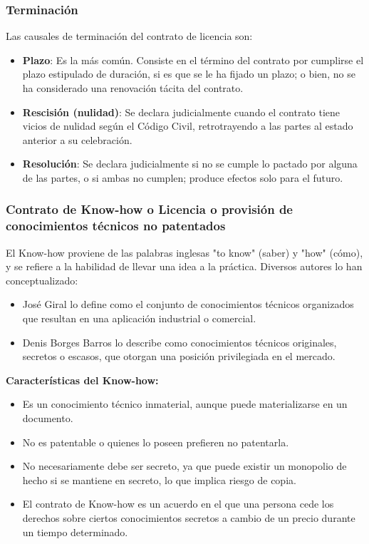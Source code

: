 \documentclass{templateNote}
\begin{document}
\subsubsection*{Terminación}
Las causales de terminación del contrato de licencia son:
\begin{itemize}
    \item \textbf{Plazo}: Es la más común. Consiste en el término del contrato por cumplirse el plazo estipulado de duración, si es que se le ha fijado un plazo; o bien, no se ha considerado una renovación tácita del contrato.
    \item \textbf{Rescisión (nulidad)}: Se declara judicialmente cuando el contrato tiene vicios de nulidad según el Código Civil, retrotrayendo a las partes al estado anterior a su celebración.
    \item \textbf{Resolución}: Se declara judicialmente si no se cumple lo pactado por alguna de las partes, o si ambas no cumplen; produce efectos solo para el futuro.
\end{itemize}

\subsubsection{Contrato de Know-how o Licencia o provisión de conocimientos técnicos no patentados}

El Know-how proviene de las palabras inglesas "to know" (saber) y "how" (cómo), y se refiere a la habilidad de llevar una idea a la práctica. Diversos autores lo han conceptualizado:

\begin{itemize}
    \item José Giral lo define como el conjunto de conocimientos técnicos organizados que resultan en una aplicación industrial o comercial.
    \item Denis Borges Barros lo describe como conocimientos técnicos originales, secretos o escasos, que otorgan una posición privilegiada en el mercado.
\end{itemize}

\textbf{Características del Know-how:}

\begin{itemize}
    \item Es un conocimiento técnico inmaterial, aunque puede materializarse en un documento.
    \item No es patentable o quienes lo poseen prefieren no patentarla.
    \item No necesariamente debe ser secreto, ya que puede existir un monopolio de hecho si se mantiene en secreto, lo que implica riesgo de copia.
    \item El contrato de Know-how es un acuerdo en el que una persona cede los derechos sobre ciertos conocimientos secretos a cambio de un precio durante un tiempo determinado.
\end{itemize}
\end{document}

